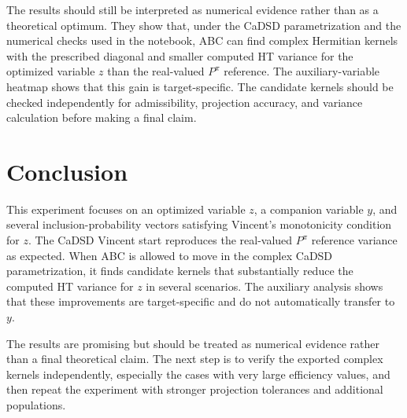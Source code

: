 \documentclass[12pt]{article}
\newcommand{\Ppi}{P^{\pi}}
\begin{document}
The results should still be interpreted as numerical evidence rather than as a theoretical optimum. They show that, under the CaDSD parametrization and the numerical checks used in the notebook, ABC can find complex Hermitian kernels with the prescribed diagonal and smaller computed HT variance for the optimized variable \(z\) than the real-valued \(\Ppi\) reference. The auxiliary-variable heatmap shows that this gain is target-specific. The candidate kernels should be checked independently for admissibility, projection accuracy, and variance calculation before making a final claim.

\section{Conclusion}

This experiment focuses on an optimized variable \(z\), a companion variable \(y\), and several inclusion-probability vectors satisfying Vincent's monotonicity condition for \(z\). The CaDSD Vincent start reproduces the real-valued \(\Ppi\) reference variance as expected. When ABC is allowed to move in the complex CaDSD parametrization, it finds candidate kernels that substantially reduce the computed HT variance for \(z\) in several scenarios. The auxiliary analysis shows that these improvements are target-specific and do not automatically transfer to \(y\).

The results are promising but should be treated as numerical evidence rather than a final theoretical claim. The next step is to verify the exported complex kernels independently, especially the cases with very large efficiency values, and then repeat the experiment with stronger projection tolerances and additional populations.
\end{document}
